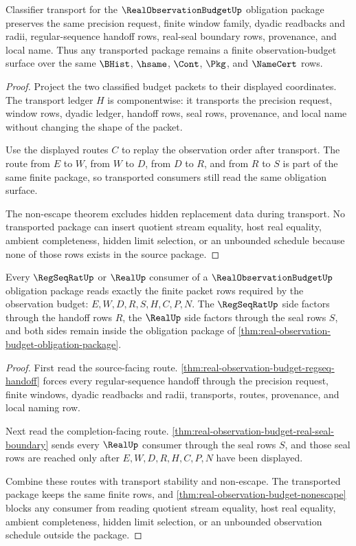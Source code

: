 \begin{theorem}
\label{thm:real-observation-budget-transport-stability}
Classifier transport for the $\RealObservationBudgetUp$ obligation package preserves the same precision request, finite window family, dyadic readbacks and radii, regular-sequence handoff rows, real-seal boundary rows, provenance, and local name. Thus any transported package remains a finite observation-budget surface over the same $\BHist$, $\hsame$, $\Cont$, $\Pkg$, and $\NameCert$ rows.
\end{theorem}
\begin{proof}
Project the two classified budget packets to their displayed coordinates. The transport ledger $H$ is componentwise: it transports the precision request, window rows, dyadic ledger, handoff rows, seal rows, provenance, and local name without changing the shape of the packet.

Use the displayed routes $C$ to replay the observation order after transport. The route from $E$ to $W$, from $W$ to $D$, from $D$ to $R$, and from $R$ to $S$ is part of the same finite package, so transported consumers still read the same obligation surface.

The non-escape theorem excludes hidden replacement data during transport. No transported package can insert quotient stream equality, host real equality, ambient completeness, hidden limit selection, or an unbounded schedule because none of those rows exists in the source package.
\end{proof}

\begin{theorem}
\label{thm:real-observation-budget-consumer-exactness}
Every $\RegSeqRatUp$ or $\RealUp$ consumer of a $\RealObservationBudgetUp$ obligation package reads exactly the finite packet rows required by the observation budget: $E,W,D,R,S,H,C,P,N$. The $\RegSeqRatUp$ side factors through the handoff rows $R$, the $\RealUp$ side factors through the seal rows $S$, and both sides remain inside the obligation package of \autoref{thm:real-observation-budget-obligation-package}.
\end{theorem}
\begin{proof}
First read the source-facing route. \autoref{thm:real-observation-budget-regseq-handoff} forces every regular-sequence handoff through the precision request, finite windows, dyadic readbacks and radii, transports, routes, provenance, and local naming row.

Next read the completion-facing route. \autoref{thm:real-observation-budget-real-seal-boundary} sends every $\RealUp$ consumer through the seal rows $S$, and those seal rows are reached only after $E,W,D,R,H,C,P,N$ have been displayed.

Combine these routes with transport stability and non-escape. The transported package keeps the same finite rows, and \autoref{thm:real-observation-budget-nonescape} blocks any consumer from reading quotient stream equality, host real equality, ambient completeness, hidden limit selection, or an unbounded observation schedule outside the package.
\end{proof}

